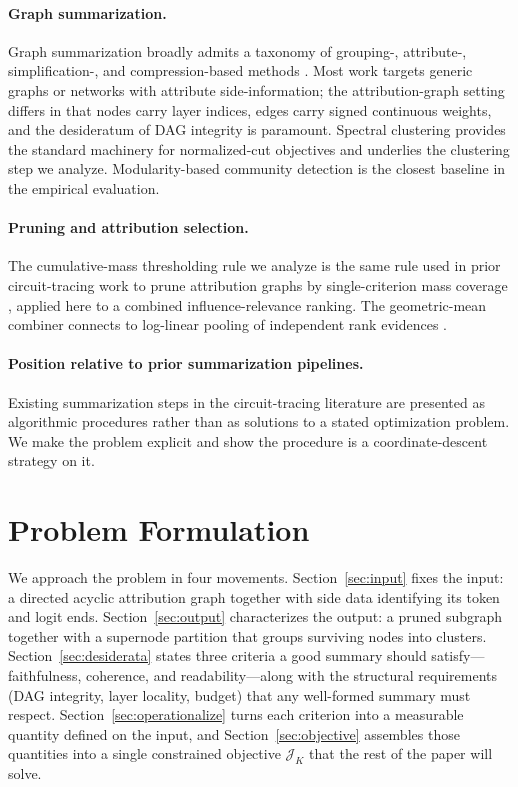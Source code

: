 \documentclass[table, 11pt]{article}
\begin{document}
\paragraph{Graph summarization.}
Graph summarization broadly admits a taxonomy of grouping-,
attribute-, simplification-, and compression-based methods
\cite{liu2018graph}. Most work targets generic graphs or networks
with attribute side-information; the attribution-graph setting differs
in that nodes carry layer indices, edges carry signed continuous
weights, and the desideratum of DAG integrity is paramount. Spectral
clustering \cite{shi2000normalized, von2007tutorial} provides the
standard machinery for normalized-cut objectives and underlies the
clustering step we analyze. Modularity-based community detection
\cite{newman2006modularity, clauset2004finding} is the closest baseline
in the empirical evaluation.

\paragraph{Pruning and attribution selection.}
The cumulative-mass thresholding rule we analyze is the same rule
used in prior circuit-tracing work to prune attribution graphs by
single-criterion mass coverage \cite{ameisen2024scaling}, applied
here to a combined influence-relevance ranking. The geometric-mean
combiner connects to log-linear pooling of independent rank
evidences \cite{genest1986combining}.

\paragraph{Position relative to prior summarization pipelines.}
Existing summarization steps in the circuit-tracing literature are
presented as algorithmic procedures rather than as solutions to a
stated optimization problem. We make the problem explicit and show
the procedure is a coordinate-descent strategy on it.


\section{Problem Formulation}\label{sec:setup}

We approach the problem in four movements. Section~\ref{sec:input}
fixes the input: a directed acyclic attribution graph together with
side data identifying its token and logit ends. Section~\ref{sec:output}
characterizes the output: a pruned subgraph together with a
supernode partition that groups surviving nodes into clusters.
Section~\ref{sec:desiderata} states three criteria a good summary
should satisfy---faithfulness, coherence, and readability---along
with the structural requirements (DAG integrity, layer locality,
budget) that any well-formed summary must respect.
Section~\ref{sec:operationalize} turns each criterion into a
measurable quantity defined on the input, and
Section~\ref{sec:objective} assembles those quantities into a
single constrained objective $\mathcal{J}_K$ that the rest of the
paper will solve.
\end{document}
